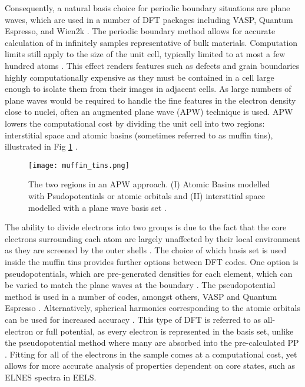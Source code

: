 Consequently, a natural basis choice for periodic boundary situations are plane waves, which are used in a number of DFT packages including VASP, Quantum Espresso, and Wien2k \cite{qe,vasp,wien2k}.  The periodic boundary method allows for accurate calculation of in infinitely samples representative of bulk materials.  Computation limits still apply to the size of the unit cell, typically limited to at most a few hundred atoms \cite{mohr_linear_2018}.  This effect renders features such as defects and grain boundaries highly computationally expensive as they must be contained in a cell large enough to isolate them from their images in adjacent cells. 
As large numbers of plane waves would be required to handle the fine features in the electron density close to nuclei, often an augmented plane wave (APW) technique is used.  APW lowers the computational cost by dividing the unit cell into two regions: interstitial space and atomic basins (sometimes referred to as muffin tins), illustrated in Fig \ref{MT} \cite{wien2k}. 
\begin{figure}
	\centering
	\texttt{[image: muffin\_tins.png]}
	\caption{The two regions in an APW approach.  (I) Atomic Basins modelled with Psudopotentials or atomic orbitals and (II) interstitial space modelled with a plane wave basis set \cite{wien2k}. }
	\label{MT}   
\end{figure}

The ability to divide electrons into two groups is due to the fact that the core electrons surrounding each atom are largely unaffected by their local environment as they are screened by the outer shells \cite{wien2k}. The choice of which basis set is used inside the muffin tins provides further options between DFT codes.  One option is pseudopotentials, which are pre-generated densities for each element, which can be varied to match the plane waves at the boundary \cite{singh_planewaves_2006}.  The pseudopotential method is used in a number of codes, amongst others, VASP and Quantum Espresso \cite{vasp,qe}.  Alternatively, spherical harmonics corresponding to the atomic orbitals can be used for increased accuracy \cite{griffiths}. This type of DFT is referred to as all-electron or full potential, as every electron is represented in the basis set, unlike the pseudopotential method where many are absorbed into the pre-calculated PP \cite{wien2k}. Fitting for all of the electrons in the sample comes at a computational cost, yet allows for more accurate analysis of properties dependent on core states, such as ELNES spectra in EELS.   
 
